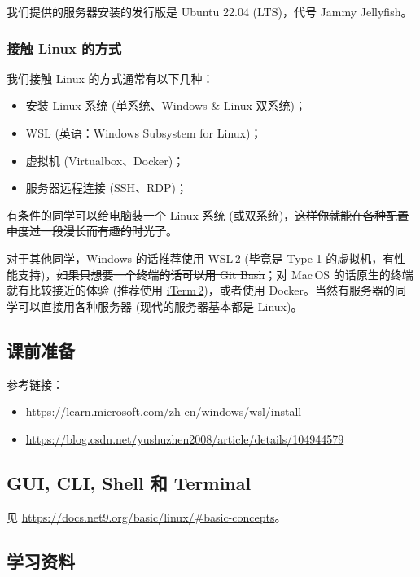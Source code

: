 \documentclass{article}
\begin{document}
	我们提供的服务器安装的发行版是 Ubuntu 22.04 (LTS)，代号 Jammy Jellyfish。

	\subsubsection{接触 Linux 的方式}

	我们接触 Linux 的方式通常有以下几种：\cite{net9-linux}

	\begin{itemize}
		\itemsep0pt
		\item 安装 Linux 系统 (单系统、Windows \& Linux 双系统)；
		\item WSL (英语：Windows Subsystem for Linux)；
		\item 虚拟机 (Virtualbox、Docker)；
		\item 服务器远程连接 (SSH、RDP)；
	\end{itemize}

	有条件的同学可以给电脑装一个 Linux 系统 (或双系统)，\sout{这样你就能在各种配置中度过一段漫长而有趣的时光了}。

	对于其他同学，Windows 的话推荐使用 \href{https://learn.microsoft.com/zh-cn/windows/wsl/install}{WSL\,2} (毕竟是 Type-1 的虚拟机，有性能支持)，\sout{如果只想要一个终端的话}\linebreak[1]\sout{可以用 Git Bash}；对 Mac\,OS 的话原生的终端就有比较接近的体验 (推荐使用 \href{https://iterm2.com/}{iTerm\,2})，或者使用 Docker。当然有服务器的同学可以直接用各种服务器 (现代的服务器基本都是 Linux)。

	\subsection{课前准备}

	参考链接：
	\begin{itemize}
		\itemsep0pt
		\item \url{https://learn.microsoft.com/zh-cn/windows/wsl/install}
		\item \url{https://blog.csdn.net/yushuzhen2008/article/details/104944579}
	\end{itemize}

	\subsection{GUI, CLI, Shell 和 Terminal}

	见 \url{https://docs.net9.org/basic/linux/#basic-concepts}。

	\subsection{学习资料}
\end{document}
